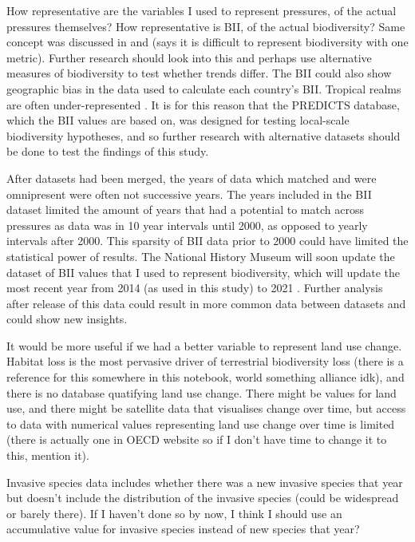 \documentclass[11pt, a4paper, titlepage]{article}
\begin{document}
	How representative are the variables I used to represent pressures, of the actual pressures themselves?
	How representative is BII, of the actual biodiversity? Same concept was discussed in \citet{goethem2021biodiversity} and \citet{secretariat2014global} (says it is difficult to represent biodiversity with one metric). Further research should look into this and perhaps use alternative measures of biodiversity to test whether trends differ. 
	The BII could also show geographic bias in the data used to calculate each country's BII. Tropical realms are often under-represented \citep{collen2008tropical}. It is for this reason that the PREDICTS database, which the BII values are based on, was designed for testing local-scale biodiversity hypotheses, and so further research with alternative datasets should be done to test the findings of this study.
	
	After datasets had been merged, the years of data which matched and were omnipresent were often not successive years. The years included in the BII dataset limited the amount of years that had a potential to match across pressures as data was in 10 year intervals until 2000, as opposed to yearly intervals after 2000. This sparsity of BII data prior to 2000 could have limited the statistical power of results. The National History Museum will soon update the dataset of BII values that I used to represent biodiversity, which will update the most recent year from 2014 (as used in this study) to 2021 \citep{nhm2021}. Further analysis after release of this data could result in more common data between datasets and could show new insights.
	
	It would be more useful if we had a better variable to represent land use change. Habitat loss is the most pervasive driver of terrestrial biodiversity loss (there is a reference for this somewhere in this notebook, world something alliance idk), and there is no database quatifying land use change. There might be values for land use, and there might be satellite data that visualises change over time, but access to data with numerical values representing land use change over time  is limited (there is actually one in OECD website so if I don't have time to change it to this, mention it). 
	
	Invasive species data includes whether there was a new invasive species that year but doesn't include the distribution of the invasive species (could be widespread or barely there). If I haven't done so by now, I think I should use an accumulative value for invasive species instead of new species that year?
	
\end{document}

